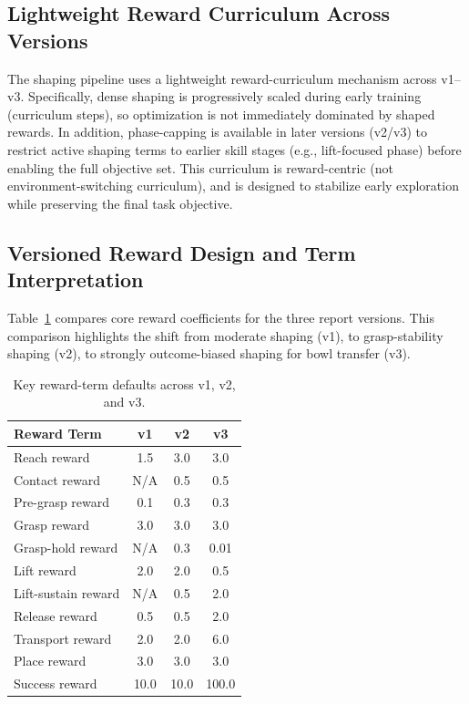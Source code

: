 \documentclass[11pt,a4paper]{article}
\begin{document}
\subsection{Lightweight Reward Curriculum Across Versions}
The shaping pipeline uses a lightweight reward-curriculum mechanism across v1--v3. Specifically, dense shaping is progressively scaled during early training (curriculum steps), so optimization is not immediately dominated by shaped rewards. In addition, phase-capping is available in later versions (v2/v3) to restrict active shaping terms to earlier skill stages (e.g., lift-focused phase) before enabling the full objective set. This curriculum is reward-centric (not environment-switching curriculum), and is designed to stabilize early exploration while preserving the final task objective.

\subsection{Versioned Reward Design and Term Interpretation}
Table~\ref{tab:reward-compare} compares core reward coefficients for the three report versions. This comparison highlights the shift from moderate shaping (v1), to grasp-stability shaping (v2), to strongly outcome-biased shaping for bowl transfer (v3).

\begin{table}[h]
\centering
\caption{Key reward-term defaults across v1, v2, and v3.}
\label{tab:reward-compare}
\begin{tabular}{@{}lccc@{}}
\toprule
Reward Term & v1 & v2 & v3 \\
\midrule
Reach reward & 1.5 & 3.0 & 3.0 \\
Contact reward & N/A & 0.5 & 0.5 \\
Pre-grasp reward & 0.1 & 0.3 & 0.3 \\
Grasp reward & 3.0 & 3.0 & 3.0 \\
Grasp-hold reward & N/A & 0.3 & 0.01 \\
Lift reward & 2.0 & 2.0 & 0.5 \\
Lift-sustain reward & N/A & 0.5 & 2.0 \\
Release reward & 0.5 & 0.5 & 2.0 \\
Transport reward & 2.0 & 2.0 & 6.0 \\
Place reward & 3.0 & 3.0 & 3.0 \\
Success reward & 10.0 & 10.0 & 100.0 \\
\bottomrule
\end{tabular}
\end{table}
\end{document}
